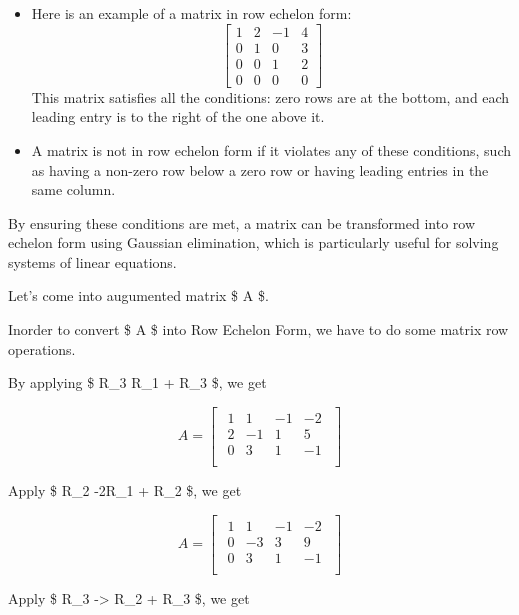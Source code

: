 \documentclass[11pt]{article}
\begin{document}
\begin{itemize}
\item
  Here is an example of a matrix in row echelon form: \[
  \begin{bmatrix}
  1 & 2 & -1 & 4 \\
  0 & 1 & 0 & 3 \\
  0 & 0 & 1 & 2 \\
  0 & 0 & 0 & 0
  \end{bmatrix}
  \] This matrix satisfies all the conditions: zero rows are at the
  bottom, and each leading entry is to the right of the one above it.
\item
  A matrix is not in row echelon form if it violates any of these
  conditions, such as having a non-zero row below a zero row or having
  leading entries in the same column.
\end{itemize}

By ensuring these conditions are met, a matrix can be transformed into
row echelon form using Gaussian elimination, which is particularly
useful for solving systems of linear equations.

    

    Let's come into augumented matrix \$ A \$.

Inorder to convert \$ A \$ into Row Echelon Form, we have to do some
matrix row operations.

    By applying \$ R\_3 \rightarrow R\_1 + R\_3 \$, we get

    \[
A = \begin{bmatrix}
\begin{array}{ccc|c}
1 & 1 & -1 & -2 \\
2 & -1 & 1 & 5 \\
0 & 3 & 1 & -1 \\
\end{array}
\end{bmatrix}
\]

    Apply \$ R\_2 \rightarrow -2R\_1 + R\_2 \$, we get

    \[
A = \begin{bmatrix}
\begin{array}{ccc|c}
1 & 1 & -1 & -2 \\
0 & -3 & 3 & 9 \\
0 & 3 & 1 & -1 \\
\end{array}
\end{bmatrix}
\]

    Apply \$ R\_3 -\textgreater{} R\_2 + R\_3 \$, we get
\end{document}
